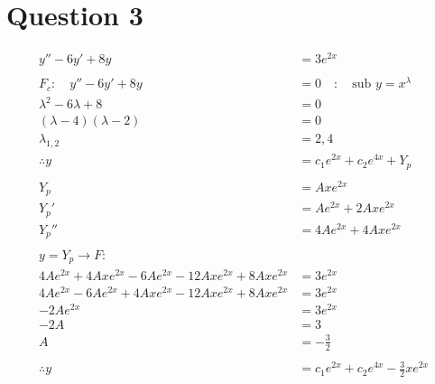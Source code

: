 \documentclass{article}
\begin{document}
\section*{Question 3}
\begin{align*}
    y''-6y'+8y                                       & =3e^{2x}                                \\
    \\
    F_c:\quad y''-6y'+8y                             & =0\quad:\quad\text{sub }y=x^\lambda     \\
    \lambda^2-6\lambda+8                             & =0                                      \\
    (\lambda-4)(\lambda-2)                           & =0                                      \\
    \lambda_{1,2}                                    & =2,4                                    \\
    \therefore y                                     & =c_1e^{2x}+c_2e^{4x}+Y_p                \\
    \\
    Y_p                                              & =Axe^{2x}                               \\
    Y_p'                                             & =Ae^{2x}+2Axe^{2x}                      \\
    Y_p''                                            & =4Ae^{2x}+4Axe^{2x}                     \\
    \\
    y=Y_p\to F:                                                                                \\
    4Ae^{2x}+4Axe^{2x}-6Ae^{2x}-12Axe^{2x}+8Axe^{2x} & =3e^{2x}                                \\
    4Ae^{2x}-6Ae^{2x}+4Axe^{2x}-12Axe^{2x}+8Axe^{2x} & =3e^{2x}                                \\
    -2Ae^{2x}                                        & =3e^{2x}                                \\
    -2A                                              & =3                                      \\
    A                                                & =-\frac{3}{2}                           \\
    \\
    \therefore y                                     & =c_1e^{2x}+c_2e^{4x}-\frac{3}{2}xe^{2x}
\end{align*}
\end{document}

